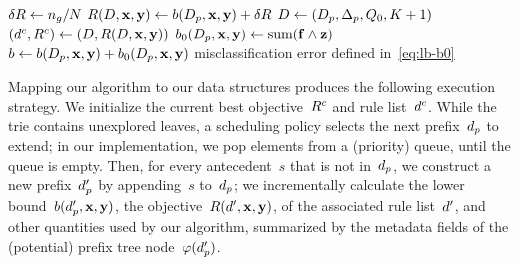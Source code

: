 \begin{algorithm}[t!]
\begin{algorithmic}
       \Else
           \State $\delta R \gets n_g / N$ 
       \EndIf
       \State $R({D}, \mathbf{x}, \mathbf{y}) \gets b(D_p, \mathbf{x}, \mathbf{y}) + \delta R$ 
       \State ${D} \gets (D_p, \Delta_p, Q_0, K+1)$ 
       \If {$\Obj(\RLB, \x, \y) < \CurrentObj$}
           \State $(d^c, {R^c}) \gets ({D}, R({D}, \mathbf{x}, \mathbf{y}))$ 
        \EndIf
        \State $b_0(D_p, \mathbf{x}, \mathbf{y}) \gets \textnormal{sum}(\mathbf{f} \wedge \mathbf{z})$ 
        \State $b \gets b(D_p, \mathbf{x}, \mathbf{y}) + b_0(D_p, \mathbf{x}, \mathbf{y})$ \hfill misclassification error defined in~\eqref{eq:lb-b0}
            \State \Continue {}
        \EndIf
        \State {} 
    \EndIf
\EndFor
\end{algorithmic}
\end{algorithm}

Mapping our algorithm to our data structures produces the following execution strategy.
%
We initialize the current best objective~${R^c}$ and rule list~$d^c$.
%
While the trie contains unexplored leaves, a scheduling policy selects the next prefix~$d_p$
to extend; in our implementation, we pop elements from a (priority) queue, until the queue is empty.
%
Then, for every antecedent~$s$ that is not in~$d_p$,
we construct a new prefix~$d_p'$ by appending~$s$ to~$d_p$;
we incrementally calculate the lower bound~$b(d_p', \mathbf{x}, \mathbf{y})$,
the objective~$R({d}', \mathbf{x}, \mathbf{y})$, of the associated rule list~${d}'$,
and other quantities used by our algorithm, summarized by the metadata fields of
the (potential) prefix tree node~$\varphi(d_p')$.

